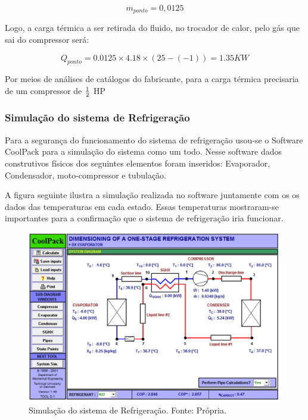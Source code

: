             \begin{equation}
                m_{ponto} = 0,0125
            \end{equation}

            Logo, a carga térmica a ser retirada do fluido, no trocador de calor, pelo gás
            que sai do compressor será:

            \begin{equation}
                Q_{ponto} = 0.0125 \times 4.18 \times (25-(-1)) = 1.35 KW
            \end{equation}

            Por meios de análises de catálogos do fabricante, para a carga térmica
            precisaria de um compressor de $1 \over 2$ HP

            \subsubsection[Simulação do sistema de Refrigeração]{Simulação do sistema de Refrigeração}
                Para a segurança do funcionamento do sistema de refrigeração usou-se o
                Software CoolPack para a simulação do sistema como um todo. Nesse software dados
                construtivos físicos dos seguintes elementos foram inseridos: Evaporador,
                Condensador, moto-compressor e tubulação.
                
                A figura seguinte ilustra a simulação realizada no software juntamente com os os
                dados das temperaturas em cada estado. Essas temperaturas mostraram-se
                importantes para a confirmação que o sistema de refrigeração iria funcionar.

                \begin{figure}[!htb]
            		\centering
            		\includegraphics[scale= 0.3]{figuras/simulacao-refrigeracao.png}
            		\caption{Simulação do sistema de Refrigeração. Fonte: Própria.}
            		\label{simulacao-refrigeracao}
                \end{figure}
                
